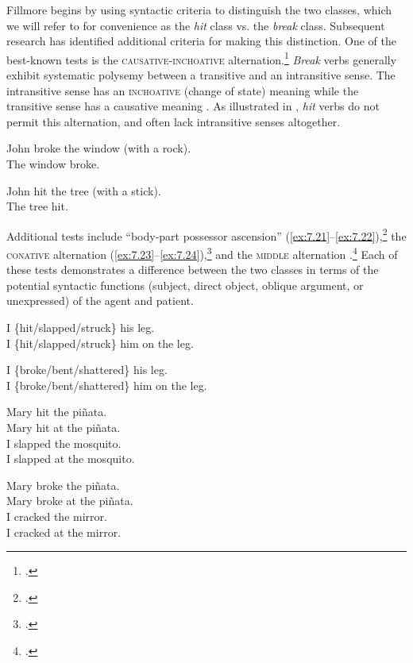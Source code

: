 Fillmore begins by using syntactic criteria to distinguish the two classes, which we will refer to for convenience as the \textit{hit} class vs. the \textit{break} class. Subsequent research has identified additional criteria for making this distinction. One of the best-known tests is the \textsc{causative-inchoative} alternation.\footnote{\citet[122--123]{Fillmore1970}.} \textit{Break} verbs generally exhibit systematic polysemy between a transitive and an intransitive sense. The intransitive sense has an \textsc{inchoative} (change of state) meaning while the transitive sense has a causative meaning . As illustrated in , \textit{hit} verbs do not permit this alternation, and often lack intransitive senses altogether.


\ea \label{ex:7.19}
\ea  John broke the window (with a rock).\\
\ex  The window broke.
                       \z
\z

\ea \label{ex:7.20}
\ea  John hit the tree (with a stick).\\
\ex *The tree hit.
                       \z
\z


Additional tests include “body-part possessor ascension” (\ref{ex:7.21}--\ref{ex:7.22}),\footnote{\citet[126]{Fillmore1970}.} the \textsc{conative} alternation (\ref{ex:7.23}--\ref{ex:7.24}),\footnote{\citet{GuersselEtAl1985,Levin1993}.} and the \textsc{middle} alternation .\footnote{\citet{Fillmore1977,HaleKeyser1987,Levin1993}.} Each of these tests demonstrates a difference between the two classes in terms of the potential syntactic functions (subject, direct object, oblique argument, or unexpressed) of the agent and patient.


\ea \label{ex:7.21}
\ea  I \{hit/slapped/struck\} his leg.\\
\ex  I \{hit/slapped/struck\} him on the leg.
                       \z
\z

\ea \label{ex:7.22}
\ea  I \{broke/bent/shattered\} his leg.\\
\ex *I \{broke/bent/shattered\} him on the leg.
                       \z
\z

\ea \label{ex:7.23}
\ea  Mary hit the piñata.\\
\ex  Mary hit at the piñata.\\
\ex  I slapped the mosquito.\\
\ex  I slapped at the mosquito.
                       \z
\z

\ea \label{ex:7.24}
\ea  Mary broke the piñata.\\
\ex  *Mary broke at the piñata.\\
\ex  I cracked the mirror.\\
\ex  *I cracked at the mirror.
                       \z
\z

